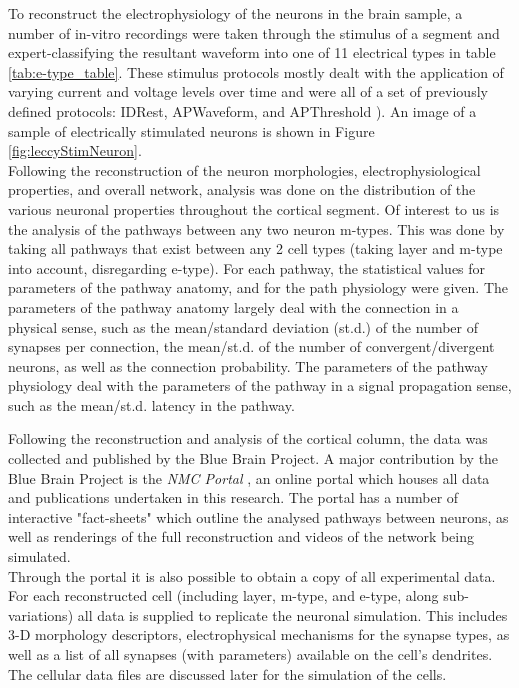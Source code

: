 To reconstruct the electrophysiology of the neurons in the brain sample, a number of in-vitro recordings were taken through the stimulus of a segment and expert-classifying the resultant waveform into one of 11 electrical types in table \ref{tab:e-type_table}. These stimulus protocols mostly dealt with the application of varying current and voltage levels over time and were all of a set of previously defined protocols: IDRest, APWaveform, and APThreshold \cite{wang2002anatomical}\cite{stimProtMark}). An image of a sample of electrically stimulated neurons is shown in Figure \ref{fig:leccyStimNeuron}.\\
Following the reconstruction of the neuron morphologies, electrophysiological properties, and overall network, analysis was done on the distribution of the various neuronal properties throughout the cortical segment. Of interest to us is the analysis of the pathways between any two neuron m-types. This was done by taking all pathways that exist between any 2 cell types (taking layer and m-type into account, disregarding e-type). For each pathway, the statistical values for parameters of the pathway anatomy, and for the path physiology were given. The parameters of the pathway anatomy largely deal with the connection in a physical sense, such as the mean/standard deviation (st.d.) of the number of synapses per connection, the mean/st.d. of the number of convergent/divergent neurons, as well as the connection probability. The parameters of the pathway physiology deal with the parameters of the pathway in a signal propagation sense, such as the mean/st.d. latency in the pathway. \\
\par
Following the reconstruction and analysis of the cortical column, the data was collected and published by the Blue Brain Project. A major contribution by the Blue Brain Project is the \emph{NMC Portal} \cite{nmcPortal}, an online portal which houses all data and publications undertaken in this research. The portal has a number of interactive "fact-sheets" which outline the analysed pathways between neurons, as well as renderings of the full reconstruction and videos of the network being simulated.\\
Through the portal it is also possible to obtain a copy of all experimental data. For each reconstructed cell (including layer, m-type, and e-type, along sub-variations) all data is supplied to replicate the neuronal simulation. This includes 3-D morphology descriptors, electrophysical mechanisms for the synapse types, as well as a list of all synapses (with parameters) available on the cell's dendrites. The cellular data files are discussed later for the simulation of the cells.\\

